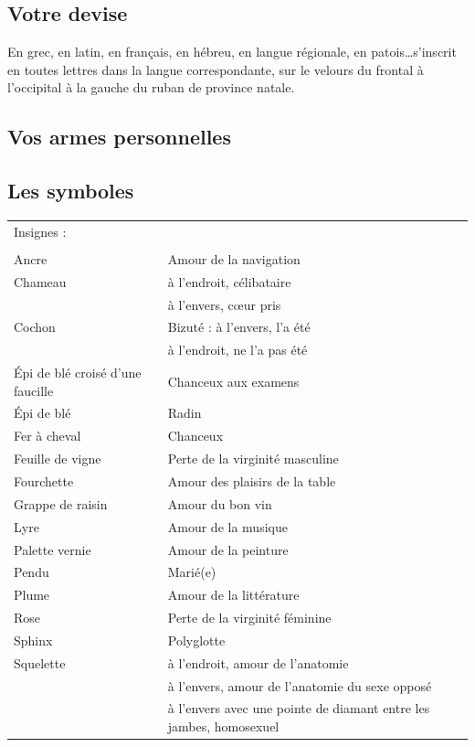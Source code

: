\subsection{Votre devise}
         En grec, en latin, en français, en hébreu, en langue régionale, en patois\ldots s'inscrit
en toutes lettres dans la langue correspondante, sur le velours du frontal à l'occipital à la
gauche du ruban de province natale.

\subsection{Vos armes personnelles}

\subsection{Les symboles}
\begin{center}
\begin{tabularx}{\textwidth}{X X}
\multicolumn{2}{l}{Insignes :}\\
\\
Ancre                            & Amour de la navigation\\
Chameau                          & à l'endroit, célibataire\\
                                 & à l'envers, c\oe ur pris\\
Cochon                           &  Bizuté : à l'envers, l'a été\\
                                 & à l'endroit, ne l'a pas été  \\
Épi de blé croisé d'une faucille & Chanceux aux examens\\
Épi de blé                       & Radin\\
Fer à cheval                     & Chanceux\\
Feuille de vigne                 & Perte de la virginité masculine\\
Fourchette                       & Amour des plaisirs de la table\\
Grappe de raisin                 & Amour du bon vin\\
Lyre                             & Amour de la musique\\
Palette vernie                   & Amour de la peinture\\
Pendu                            & Marié(e)\\
Plume                            & Amour de la littérature\\
Rose                             & Perte de la virginité féminine\\
Sphinx                           & Polyglotte\\
Squelette                        & à l'endroit, amour de l'anatomie\\
                                 & à l'envers, amour de l'anatomie du sexe opposé \\
                                 & à l'envers avec une pointe de diamant entre les
                                   jambes, homosexuel\\
\end{tabularx}
\end{center}

